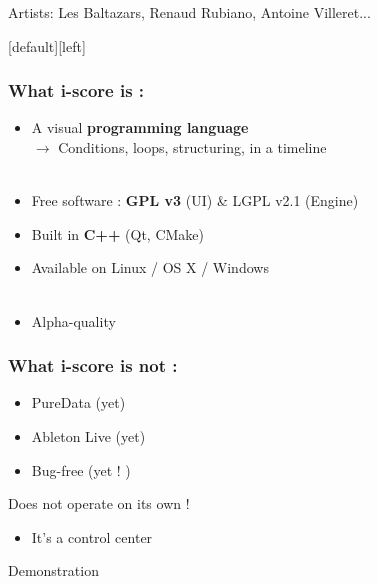 \documentclass{beamer}
\begin{document}
\begin{frame}
    {\large Artists: Les Baltazars, Renaud Rubiano, Antoine Villeret...}
    
\end{frame}

[default][left]
    \begin{frame}
        \frametitle{What i-score is : }
        \Large
        \begin{itemize}        
        \item<1-> A visual \textbf{programming language} \\ $\rightarrow$ Conditions, loops, structuring, in a timeline\\~\\
        \item<2-> Free software : \textbf{GPL v3 }(UI) \& LGPL v2.1 (Engine)
        \item<2-> Built in \textbf{C++} (Qt, CMake)        
        \item<2-> Available on Linux / OS X / Windows\\ ~\\
        \item<3-> Alpha-quality 
        \end{itemize}
    \end{frame}
    \begin{frame}
        \frametitle{What i-score is not : }
        \Large
        \begin{itemize} [<+->]
            \item PureData (yet)
            \item Ableton Live (yet)       
            \item Bug-free (yet ! )
        \end{itemize}
        \vspace{2em}
        
        \pause[\thebeamerpauses]
        \Huge Does not operate on its own !
        \Large
        \begin{itemize} 
            \item  It's a control center
        \end{itemize}
    \end{frame}
    
    \begin{frame}
    	\centering \Huge Demonstration
    \end{frame}
    
\end{document}
